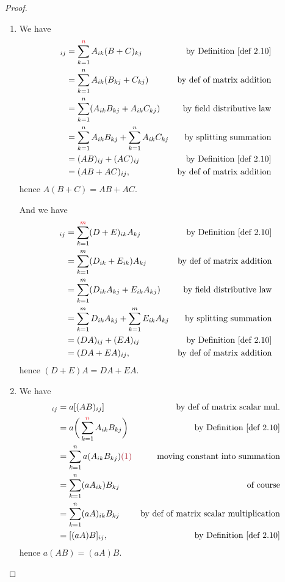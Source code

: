 \begin{proof} \ 
\begin{enumerate}
\item
We have
\begin{align*}
    [A(B + C)]_{ij} & = \sum_{k = 1}^{\RED{n}} A_{ik} (B + C)_{kj} & \text{by \DEF{2.10}} \\
                    & = \sum_{k = 1}^n A_{ik} (B_{kj} + C_{kj}) & \text{by def of matrix addition} \\
                    & = \sum_{k = 1}^n (A_{ik} B_{kj} + A_{ik} C_{kj}) & \text{by field distributive law} \\
                    & = \sum_{k = 1}^n A_{ik} B_{kj} + \sum_{k = 1}^n A_{ik} C_{kj} & \text{by splitting summation} \\
                    & = (AB)_{ij} + (AC)_{ij} & \text{by \DEF{2.10}} \\
                    & = (AB + AC)_{ij}, & \text{by def of matrix addition}
\end{align*}
hence \(A(B + C) = AB + AC\).

And we have
\begin{align*}
    [(D + E)A]_{ij} & = \sum_{k = 1}^{\RED{m}} (D + E)_{ik} A_{kj} & \text{by \DEF{2.10}} \\
                    & = \sum_{k = 1}^m (D_{ik} + E_{ik}) A_{kj} & \text{by def of matrix addition} \\
                    & = \sum_{k = 1}^m (D_{ik} A_{kj} + E_{ik} A_{kj}) & \text{by field distributive law} \\
                    & = \sum_{k = 1}^m D_{ik} A_{kj} + \sum_{k = 1}^m E_{ik} A_{kj} & \text{by splitting summation} \\
                    & = (DA)_{ij} + (EA)_{ij} & \text{by \DEF{2.10}} \\
                    & = (DA + EA)_{ij}, & \text{by def of matrix addition}
\end{align*}
hence \((D + E)A = DA + EA\).

\item
We have
\begin{align*}
    [a(AB)]_{ij} & = a[(AB)_{ij}] & \text{by def of matrix scalar mul.} \\
                 & = a\bigg( \sum_{k = 1}^{\RED{n}} A_{ik} B_{kj} \bigg) & \text{by \DEF{2.10}} \\
                 & = \sum_{k = 1}^n a (A_{ik} B_{kj}) \MAROON{(1)} & \text{moving constant into summation} \\
                 & = \sum_{k = 1}^n (a A_{ik}) B_{kj} & \text{of course} \\
                 & = \sum_{k = 1}^n (aA)_{ik} B_{kj} & \text{by def of matrix scalar multiplication} \\
                 & = [(aA)B]_{ij}, & \text{by \DEF{2.10}}
\end{align*}
hence \(a(AB) = (aA)B\).


\end{enumerate}
\end{proof}
